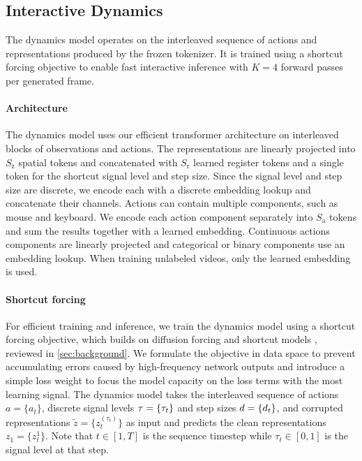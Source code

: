 \documentclass[11pt]{article}
\begin{document}
\subsection{Interactive Dynamics}
\label{sec:dynamics}

The dynamics model operates on the interleaved sequence of actions and representations produced by the frozen tokenizer.
It is trained using a shortcut forcing objective to enable fast interactive inference with $K=4$ forward passes per generated frame.

\paragraph{Architecture}

The dynamics model uses our efficient transformer architecture on interleaved blocks of observations and actions.
The representations are linearly projected into $S_\mathrm{z}$ spatial tokens and concatenated with $S_\mathrm{r}$ learned register tokens \citep{vitregister} and a single token for the shortcut signal level and step size.
Since the signal level and step size are discrete, we encode each with a discrete embedding lookup and concatenate their channels.
Actions can contain multiple components, such as mouse and keyboard.
We encode each action component separately into $S_\mathrm{a}$ tokens and sum the results together with a learned embedding.
Continuous actions components are linearly projected and categorical or binary components use an embedding lookup.
When training unlabeled videos, only the learned embedding is used.

\paragraph{Shortcut forcing}

For efficient training and inference, we train the dynamics model using a shortcut forcing objective, which builds on diffusion forcing \citep{diffusionforcing} and shortcut models \citep{shortcut}, reviewed in \cref{sec:background}.
We formulate the objective in data space to prevent accumulating errors caused by high-frequency network outputs and introduce a simple loss weight to focus the model capacity on the loss terms with the most learning signal.
The dynamics model takes the interleaved sequence of actions $a=\{a_t\}$, discrete signal levels $\tau=\{\tau_t\}$ and step sizes $d=\{d_t\}$, and corrupted representations $\tilde{z}=\{z_t^{(\tau_t)}\}$ as input and predicts the clean representations $z_1=\{z_t^1\}$.
Note that $t \in [1,T]$ is the sequence timestep while $\tau_t \in [0, 1]$ is the signal level at that step.
\end{document}
